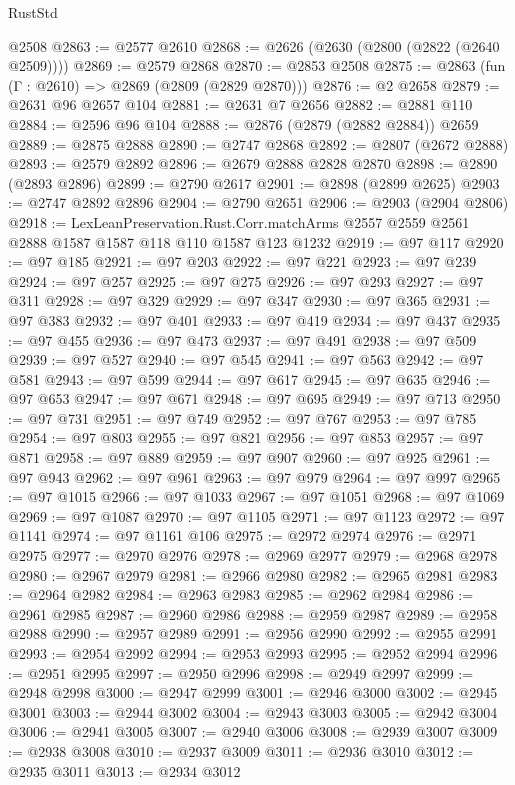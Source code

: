 \begin{lexlean}{RustStd}
\begin{coremodule}
    @2508
@2863 := @2577 @2610
@2868 := @2626 (@2630 (@2800 (@2822 (@2640 @2509))))
@2869 := @2579 @2868
@2870 := @2853 @2508
@2875 := @2863 (fun (Γ : @2610) => @2869 (@2809 (@2829 @2870)))
@2876 := @2 @2658
@2879 := @2631 @96 @2657 @104
@2881 := @2631 @7 @2656
@2882 := @2881 @110
@2884 := @2596 @96 @104
@2888 := @2876 (@2879 (@2882 @2884)) @2659
@2889 := @2875 @2888
@2890 := @2747 @2868
@2892 := @2807 (@2672 @2888)
@2893 := @2579 @2892
@2896 := @2679 @2888 @2828 @2870
@2898 := @2890 (@2893 @2896)
@2899 := @2790 @2617
@2901 := @2898 (@2899 @2625)
@2903 := @2747 @2892 @2896
@2904 := @2790 @2651
@2906 := @2903 (@2904 @2806)
@2918 := LexLeanPreservation.Rust.Corr.matchArms
    @2557
    @2559
    @2561
    @2888
    @1587
    @1587
    @118
    @110
    @1587
    @123
    @1232
@2919 := @97 @117
@2920 := @97 @185
@2921 := @97 @203
@2922 := @97 @221
@2923 := @97 @239
@2924 := @97 @257
@2925 := @97 @275
@2926 := @97 @293
@2927 := @97 @311
@2928 := @97 @329
@2929 := @97 @347
@2930 := @97 @365
@2931 := @97 @383
@2932 := @97 @401
@2933 := @97 @419
@2934 := @97 @437
@2935 := @97 @455
@2936 := @97 @473
@2937 := @97 @491
@2938 := @97 @509
@2939 := @97 @527
@2940 := @97 @545
@2941 := @97 @563
@2942 := @97 @581
@2943 := @97 @599
@2944 := @97 @617
@2945 := @97 @635
@2946 := @97 @653
@2947 := @97 @671
@2948 := @97 @695
@2949 := @97 @713
@2950 := @97 @731
@2951 := @97 @749
@2952 := @97 @767
@2953 := @97 @785
@2954 := @97 @803
@2955 := @97 @821
@2956 := @97 @853
@2957 := @97 @871
@2958 := @97 @889
@2959 := @97 @907
@2960 := @97 @925
@2961 := @97 @943
@2962 := @97 @961
@2963 := @97 @979
@2964 := @97 @997
@2965 := @97 @1015
@2966 := @97 @1033
@2967 := @97 @1051
@2968 := @97 @1069
@2969 := @97 @1087
@2970 := @97 @1105
@2971 := @97 @1123
@2972 := @97 @1141
@2974 := @97 @1161 @106
@2975 := @2972 @2974
@2976 := @2971 @2975
@2977 := @2970 @2976
@2978 := @2969 @2977
@2979 := @2968 @2978
@2980 := @2967 @2979
@2981 := @2966 @2980
@2982 := @2965 @2981
@2983 := @2964 @2982
@2984 := @2963 @2983
@2985 := @2962 @2984
@2986 := @2961 @2985
@2987 := @2960 @2986
@2988 := @2959 @2987
@2989 := @2958 @2988
@2990 := @2957 @2989
@2991 := @2956 @2990
@2992 := @2955 @2991
@2993 := @2954 @2992
@2994 := @2953 @2993
@2995 := @2952 @2994
@2996 := @2951 @2995
@2997 := @2950 @2996
@2998 := @2949 @2997
@2999 := @2948 @2998
@3000 := @2947 @2999
@3001 := @2946 @3000
@3002 := @2945 @3001
@3003 := @2944 @3002
@3004 := @2943 @3003
@3005 := @2942 @3004
@3006 := @2941 @3005
@3007 := @2940 @3006
@3008 := @2939 @3007
@3009 := @2938 @3008
@3010 := @2937 @3009
@3011 := @2936 @3010
@3012 := @2935 @3011
@3013 := @2934 @3012

\end{coremodule}
\end{lexlean}
